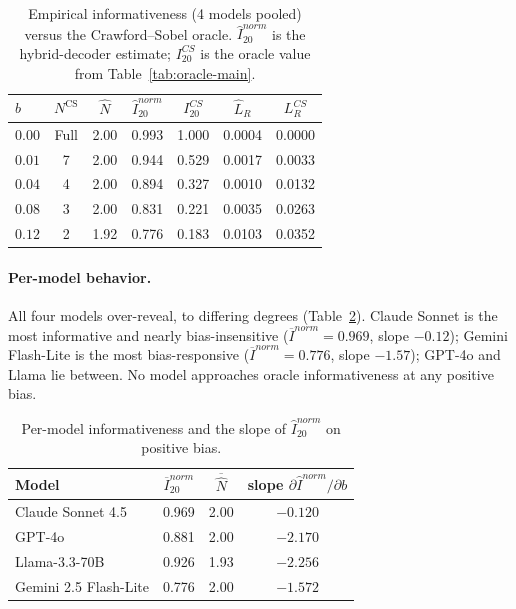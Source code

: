 \documentclass[11pt]{article}
\newcommand{\NCS}{N^{\mathrm{CS}}}
\begin{document}
\begin{table}[H]
\centering\small
\caption{Empirical informativeness (4 models pooled) versus the Crawford--Sobel oracle.  $\widehat I^{norm}_{20}$ is the hybrid-decoder estimate; $I^{CS}_{20}$ is the oracle value from Table~\ref{tab:oracle-main}.}
\label{tab:emp-bias}
\begin{tabular}{lcccccc}
\toprule
$b$ & $\NCS$ & $\widehat N$ & $\widehat I^{norm}_{20}$ & $I^{CS}_{20}$ & $\widehat L_R$ & $L_R^{CS}$ \\
\midrule
$0.00$ & Full & 2.00 & 0.993 & 1.000 & 0.0004 & 0.0000 \\
$0.01$ & 7 & 2.00 & 0.944 & 0.529 & 0.0017 & 0.0033 \\
$0.04$ & 4 & 2.00 & 0.894 & 0.327 & 0.0010 & 0.0132 \\
$0.08$ & 3 & 2.00 & 0.831 & 0.221 & 0.0035 & 0.0263 \\
$0.12$ & 2 & 1.92 & 0.776 & 0.183 & 0.0103 & 0.0352 \\
\bottomrule
\end{tabular}
\end{table}

\paragraph{Per-model behavior.}
All four models over-reveal, to differing degrees (Table~\ref{tab:emp-model}).  Claude Sonnet is the most informative and nearly bias-insensitive ($\overline I^{norm}=0.969$, slope $-0.12$); Gemini Flash-Lite is the most bias-responsive ($\overline I^{norm}=0.776$, slope $-1.57$); GPT-4o and Llama lie between.  No model approaches oracle informativeness at any positive bias.

\begin{table}[H]
\centering\small
\caption{Per-model informativeness and the slope of $\widehat I^{norm}_{20}$ on positive bias.}
\label{tab:emp-model}
\begin{tabular}{lccc}
\toprule
Model & $\overline I^{norm}_{20}$ & $\overline{\widehat N}$ & slope $\partial \widehat I^{norm}/\partial b$ \\
\midrule
Claude Sonnet 4.5 & 0.969 & 2.00 & $-0.120$ \\
GPT-4o & 0.881 & 2.00 & $-2.170$ \\
Llama-3.3-70B & 0.926 & 1.93 & $-2.256$ \\
Gemini 2.5 Flash-Lite & 0.776 & 2.00 & $-1.572$ \\
\bottomrule
\end{tabular}
\end{table}
\end{document}
